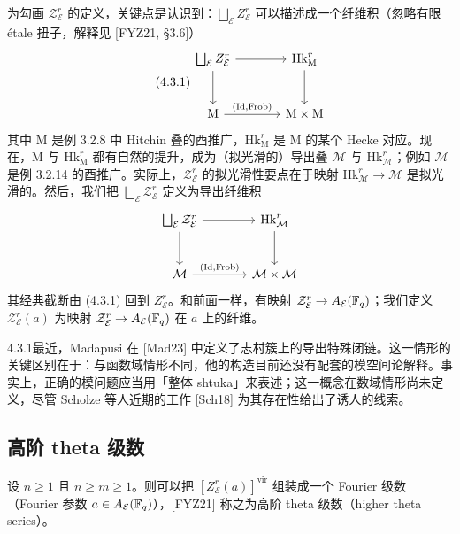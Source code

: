为勾画 $\mathcal Z^r_{\mathcal E}$ 的定义，关键点是认识到：$\bigsqcup_{\mathcal E}Z^r_{\mathcal E}$ 可以描述成一个纤维积（忽略有限 \'etale 扭子，解释见 [FYZ21, §3.6]）
\begin{equation}\tag{4.3.1}\label{eq:a6-03-1}
\begin{tikzcd}[column sep=large, row sep=large]
\bigsqcup_{\mathcal E}Z^r_{\mathcal E} \arrow[r] \arrow[d] & \mathrm{Hk}^r_{\mathrm M} \arrow[d] \\
\mathrm M \arrow[r, "{(\mathrm{Id},\mathrm{Frob})}"] & \mathrm M\times\mathrm M
\end{tikzcd}
\end{equation}
其中 $\mathrm M$ 是例 3.2.8 中 Hitchin 叠的酉推广，$\mathrm{Hk}^r_{\mathrm M}$ 是 $\mathrm M$ 的某个 Hecke 对应。现在，$\mathrm M$ 与 $\mathrm{Hk}^r_{\mathrm M}$ 都有自然的提升，成为（拟光滑的）导出叠 $\mathcal M$ 与 $\mathrm{Hk}^r_{\mathcal M}$；例如 $\mathcal M$ 是例 3.2.14 的酉推广。实际上，$\mathcal Z^r_{\mathcal E}$ 的拟光滑性要点在于映射 $\mathrm{Hk}^r_{\mathcal M}\to\mathcal M$ 是拟光滑的。然后，我们把 $\bigsqcup_{\mathcal E}\mathcal Z^r_{\mathcal E}$ 定义为导出纤维积
\[
\begin{tikzcd}[column sep=large, row sep=large]
\bigsqcup_{\mathcal E}\mathcal Z^r_{\mathcal E} \arrow[r] \arrow[d] & \mathrm{Hk}^r_{\mathcal M} \arrow[d] \\
\mathcal M \arrow[r, "{(\mathrm{Id},\mathrm{Frob})}"] & \mathcal M\times\mathcal M
\end{tikzcd}
\]
其经典截断由 (4.3.1) 回到 $Z^r_{\mathcal E}$。和前面一样，有映射 $\mathcal Z^r_{\mathcal E}\to A_{\mathcal E}(\mathbb{F}_q)$；我们定义 $\mathcal Z^r_{\mathcal E}(a)$ 为映射 $\mathcal Z^r_{\mathcal E}\to A_{\mathcal E}(\mathbb{F}_q)$ 在 $a$ 上的纤维。

\begin{rem}{4.3.1}\label{thm:a6-03-1}最近，Madapusi 在 [Mad23] 中定义了志村簇上的导出特殊闭链。这一情形的关键区别在于：与函数域情形不同，他的构造目前还没有配套的模空间论解释。事实上，正确的模问题应当用「整体 shtuka」来表述；这一概念在数域情形尚未定义，尽管 Scholze 等人近期的工作 [Sch18] 为其存在性给出了诱人的线索。
\end{rem}

\subsection{高阶 theta 级数}

设 $n\ge1$ 且 $n\ge m\ge1$。则可以把 $[Z^r_{\mathcal E}(a)]^{\mathrm{vir}}$ 组装成一个 Fourier 级数（Fourier 参数 $a\in A_{\mathcal E}(\mathbb{F}_q)$），[FYZ21] 称之为高阶 theta 级数（higher theta series）。

